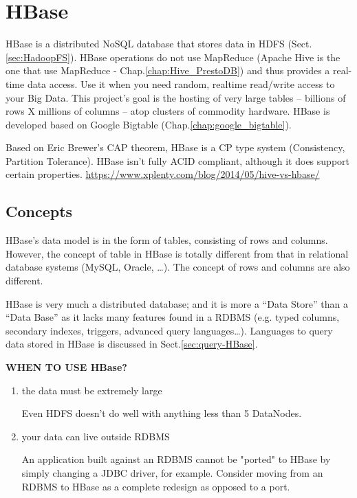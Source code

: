 \chapter{HBase}
\label{chap:HBase}

HBase is a distributed NoSQL database that stores data in HDFS
(Sect.\ref{sec:HadoopFS}). HBase operations do not use MapReduce (Apache Hive is
the one that use MapReduce - Chap.\ref{chap:Hive_PrestoDB}) and thus provides a real-time
data access. Use it when you need  random, realtime read/write access to your
Big Data. This project's goal is the hosting of very large tables -- billions of
rows X millions of columns -- atop clusters of commodity hardware. HBase is
developed based on Google Bigtable (Chap.\ref{chap:google_bigtable}).

Based on Eric Brewer's CAP theorem, HBase is a CP type system (Consistency,
Partition Tolerance). HBase isn't fully ACID compliant, although it does support
certain properties. \url{https://www.xplenty.com/blog/2014/05/hive-vs-hbase/}

\section{Concepts}

HBase's data model is in the form of tables, consisting of rows and columns.
However, the concept of table in HBase is totally different from that in
relational database systems (MySQL, Oracle, \ldots). The concept of rows and
columns are also different. 

HBase is very much a distributed database; and it is more a ``Data Store'' than
a ``Data Base''  as it lacks many features found in a RDBMS (e.g. typed
columns, secondary indexes, triggers, advanced query languages\ldots). Languages
to query data stored in HBase is discussed in Sect.\ref{sec:query-HBase}.


{\bf WHEN TO USE HBase?}
\begin{enumerate}
  \item the data must be extremely large

Even HDFS doesn't do well with anything less than 5 DataNodes.
  
  \item your data can live outside RDBMS
  
  An application built against an RDBMS cannot be "ported" to HBase by simply
  changing a JDBC driver, for example. Consider moving from an RDBMS to HBase as
  a complete redesign as opposed to a port. 
  
\end{enumerate}


